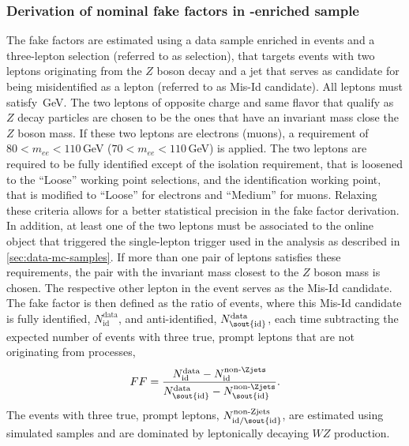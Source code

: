 \subsubsection{Derivation of nominal fake factors in \Zjets-enriched sample}
\label{subsubsec:zjets-ffs}
The fake factors are estimated using a data sample enriched in \Zjets events and a three-lepton selection (referred to as \Zjets selection), that targets events with two leptons originating from the $Z$ boson decay and a jet that serves as candidate for being misidentified as a lepton (referred to as Mis-Id candidate). 
All leptons must satisfy \,GeV.
The two leptons of opposite charge and same flavor that qualify as $Z$ decay particles are chosen to be the ones that have an invariant mass close the $Z$ boson mass. If these two leptons are electrons (muons), a requirement of $80 < m_{ee} < 110\,$GeV ($70 < m_{ee} < 110\,$GeV) is applied.
The two leptons are required to be fully identified except of the isolation requirement, that is loosened to the ``Loose'' working point selections, and the identification working point, that is modified to ``Loose'' for electrons and ``Medium'' for muons.
Relaxing these criteria allows for a better statistical precision in the fake factor derivation.
In addition, at least one of the two leptons must be associated to the online object that triggered the single-lepton trigger used in the analysis as described in \cref{sec:data-mc-samples}.
If more than one pair of leptons satisfies these requirements, the pair with the invariant mass closest to the $Z$ boson mass is chosen.
The respective other lepton in the event serves as the Mis-Id candidate.
The fake factor is then defined as the ratio of events, where this Mis-Id candidate is fully identified, $N_{\text{id}}^{\text{data}}$, and anti-identified, $N_{\text{\sout{id}}}^{\text{data}}$, each time subtracting the expected number of events with three true, prompt leptons that are not originating from \Zjets processes,
\begin{equation}
    \label{eq:ff}
    FF = \frac{ N_{\text{id}}^{\text{data}} - N_{\text{id}}^{\text{non-\Zjets}}}{N_{\text{\sout{id}}}^{\text{data}} - N_{\text{\sout{id}}}^{\text{non-\Zjets}}}.
\end{equation}
The events with three true, prompt leptons, $N_{\text{id/\sout{id}}}^{\text{non-Zjets}}$, are estimated using simulated samples and are dominated by leptonically decaying $WZ$ production. 
